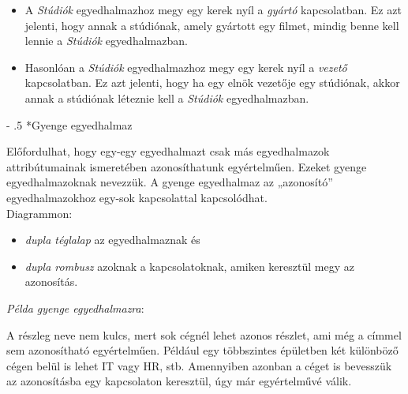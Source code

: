 \documentclass[tikz,12pt,margin=0px]{article}
\makeatletter
\renewcommand\paragraph{%
	\@startsection{paragraph}{4}{0mm}%
	{-\baselineskip}%
	{.5\baselineskip}%
	{\normalfont\normalsize\bfseries}}
\makeatother
\begin{document}
    \begin{itemize}
        \item \noindent A \emph{Stúdiók} egyedhalmazhoz megy egy kerek nyíl a \emph{gyártó} kapcsolatban. Ez azt jelenti, hogy annak a stúdiónak, amely gyártott egy filmet, mindig benne kell lennie a \emph{Stúdiók} egyedhalmazban.
        \item Hasonlóan a \emph{Stúdiók} egyedhalmazhoz megy egy kerek nyíl a \emph{vezető} kapcsolatban. Ez azt jelenti, hogy ha egy elnök vezetője egy stúdiónak, akkor annak a stúdiónak léteznie kell a \emph{Stúdiók} egyedhalmazban.
    \end{itemize}

    \paragraph*{Gyenge egyedhalmaz\\}

    \noindent Előfordulhat, hogy egy-egy egyedhalmazt csak más egyedhalmazok attribútumainak ismeretében azonosíthatunk egyértelműen. Ezeket gyenge egyedhalmazoknak nevezzük. A gyenge egyedhalmaz az „azonosító” egyedhalmazokhoz egy-sok kapcsolattal kapcsolódhat.\\

    \noindent Diagrammon:
    \begin{itemize}
        \item \emph{dupla téglalap} az egyedhalmaznak és
        \item \emph{dupla rombusz} azoknak a kapcsolatoknak, amiken keresztül megy az azonosítás.\\
    \end{itemize}

    {\small \emph{Példa gyenge egyedhalmazra}:
    \begin{center}
    \end{center}

    \noindent A részleg neve nem kulcs, mert sok cégnél lehet azonos részlet, ami még a címmel sem azonosítható egyértelműen. Például egy többszintes épületben két különböző cégen belül is lehet IT vagy HR, stb. Amennyiben azonban a céget is bevesszük az azonosításba egy kapcsolaton keresztül, úgy már egyértelművé válik.}
\end{document}
